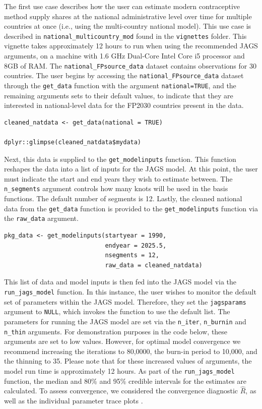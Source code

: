 The first use case describes how the user can estimate modern contraceptive method supply shares at the national administrative level over time for multiple countries at once (i.e., using the multi-country national model). This use case is described in \texttt{national\_multicountry\_mod} found in the \texttt{vignettes} folder. This vignette takes approximately 12 hours to run when using the recommended JAGS arguments, on a machine with 1.6 GHz Dual-Core Intel Core i5 processor and 8GB of RAM. The \texttt{national\_FPsource\_data} dataset contains observations for 30 countries. The user begins by accessing the \texttt{national\_FPsource\_data} dataset through the \texttt{get\_data} function with the argument \texttt{national=TRUE}, and the remaining arguments sets to their default values, to indicate that they are interested in national-level data for the FP2030 countries present in the data.

\begin{verbatim}
cleaned_natdata <- get_data(national = TRUE)

dplyr::glimpse(cleaned_natdata$mydata)
\end{verbatim}

Next, this data is supplied to the \texttt{get\_modelinputs} function. This function reshapes the data into a list of inputs for the JAGS model. At this point, the user must indicate the start and end years they wish to estimate between. The \texttt{n\_segments} argument controls how many knots will be used in the basis functions. The default number of segments is 12. Lastly, the cleaned national data from the \texttt{get\_data} function is provided to the \texttt{get\_modelinputs} function via the \texttt{raw\_data} argument.

\begin{verbatim}
pkg_data <- get_modelinputs(startyear = 1990, 
                            endyear = 2025.5, 
                            nsegments = 12, 
                            raw_data = cleaned_natdata)
\end{verbatim}

This list of data and model inputs is then fed into the JAGS model via the \texttt{run\_jags\_model} function. In this instance, the user wishes to monitor the default set of parameters within the JAGS model. Therefore, they set the \texttt{jagsparams} argument to \texttt{NULL}, which invokes the function to use the default list. The parameters for running the JAGS model are set via the \texttt{n\_iter}, \texttt{n\_burnin} and \texttt{n\_thin} arguments. For demonstration purposes in the code below, these arguments are set to low values. However, for optimal model convergence we recommend increasing the iterations to 80,0000, the burn-in period to 10,000, and the thinning to 35. Please note that for these increased values of arguments, the model run time is approximately 12 hours. As part of the \texttt{run\_jags\_model} function, the median and 80\% and 95\% credible intervals for the estimates are calculated. To assess convergence, we considered the convergence diagnostic \(\hat{R}\), as well as the individual parameter trace plots \citep{Vehtari_2021}.

